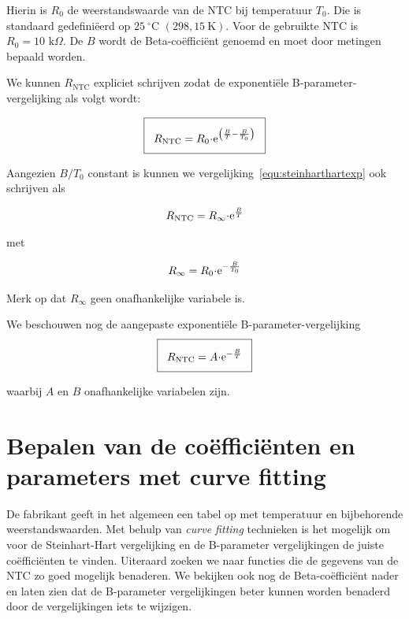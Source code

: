 \documentclass[12pt,a4paper,final,twoside,fleqn]{article}
\newcommand{\rntc}{R_\text{NTC}}
\let\oldcdot\cdot
\renewcommand{\cdot}{\kern-.10em\oldcdot\kern-.10em}
\begin{document}
Hierin is $R_0$ de weerstandswaarde van de NTC bij temperatuur $T_0$. Die is standaard
gedefini\"eerd op $25\:^\circ\text{C}$ $(298,15\: \text{K})$. Voor de gebruikte NTC
is $R_0 = 10\text{ k}\Omega$.
De $B$ wordt de Beta-co\"effici\"ent genoemd en  moet door metingen bepaald worden.

We kunnen $\rntc$ expliciet schrijven zodat de exponenti\"ele B-parameter-vergelijking
als volgt wordt:

\begin{equation}
\label{equ:steinharthartexp}
\setlength\fboxsep{2ex}
\boxed{R_\text{NTC} = R_0\cdot\text{e}^{\left(\frac{B}{T}-\frac{B}{T_0}\right)}}
\end{equation}

Aangezien $B/T_0$ constant is kunnen we vergelijking~\eqref{equ:steinharthartexp}
ook schrijven als

\begin{equation}
\label{equ:betafuncexp}
R_\text{NTC} = R_\infty \cdot\text{e}^\frac{B}{T}
\end{equation}

met

\begin{equation}
R_\infty = R_0\cdot \text{e}^{-\frac{B}{T_0}}
\end{equation}

Merk op dat $R_\infty$ geen onafhankelijke variabele is.

We beschouwen nog de aangepaste exponenti\"ele B-parameter-vergelijking
\begin{equation}
\label{equ:steinharthartexpadapt}
\setlength\fboxsep{2ex}
\boxed{\rntc = A\cdot\text{e}^{-\frac{B}{T}}}
\end{equation}

waarbij $A$ en $B$ onafhankelijke variabelen zijn.

\clearpage
\section{Bepalen van de co\"effici\"enten en parameters met curve fitting}
\label{sec:bepalenparameters}
De fabrikant geeft in het algemeen een tabel op met temperatuur en bijbehorende
weerstandswaarden. Met behulp van \textsl{curve fitting} technieken is het
mogelijk om voor de Steinhart-Hart vergelijking en de B-parameter vergelijkingen
de juiste co\"effici\"enten te vinden. Uiteraard zoeken we naar functies die de
gegevens van de NTC zo goed mogelijk benaderen. We bekijken ook nog de
Beta-co\"effici\"ent nader en laten zien dat de B-parameter vergelijkingen
beter kunnen worden benaderd door de vergelijkingen iets te wijzigen.
\end{document}
